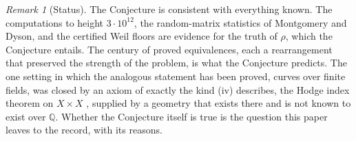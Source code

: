 \documentclass[11pt]{article}
\theoremstyle{definition}
\theoremstyle{remark}
\newtheorem{remark}[theorem]{Remark}
\newcommand{\Q}{\mathbb Q}
\begin{document}
\begin{remark}[Status]
The Conjecture is consistent with everything known. The computations to height $3\cdot10^{12}$, the random-matrix statistics of Montgomery and Dyson, and the certified Weil floors are evidence for the truth of $\rho$, which the Conjecture entails. The century of proved equivalences, each a rearrangement that preserved the strength of the problem, is what the Conjecture predicts. The one setting in which the analogous statement has been proved, curves over finite fields, was closed by an axiom of exactly the kind (iv) describes, the Hodge index theorem on $X\times X$ \cite{WeilCurves,Deligne}, supplied by a geometry that exists there and is not known to exist over $\Q$. Whether the Conjecture itself is true is the question this paper leaves to the record, with its reasons.
\end{remark}
\end{document}
